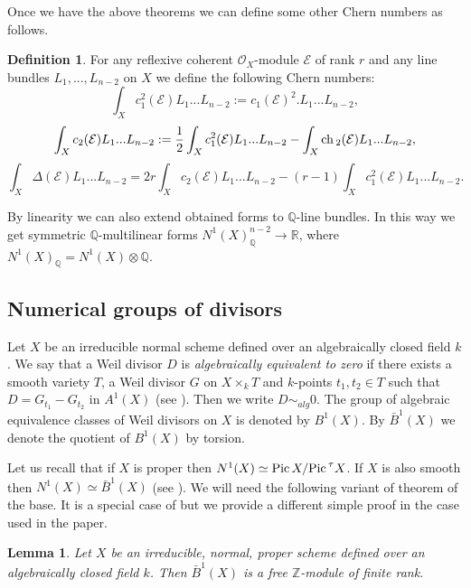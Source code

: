 \documentclass[12pt]{article}
\theoremstyle{plain}
\newtheorem{Lemma}[Thm]{\sc Lemma}
\theoremstyle{definition}
\newtheorem{Definition}[Thm]{Definition}
\theoremstyle{remark}
\newcommand{\ZZ}{{\mathbb Z}}
\newcommand{\QQ}{{\mathbb Q}}
\newcommand{\RR}{{\mathbb R}}
\newcommand{\cE}{{\mathcal E}}
\newcommand{\cO}{{\mathcal O}}
\newcommand{\Pic}{{\mathop{\rm Pic \, }}}
\newcommand{\ch}{{\mathop{\rm ch \, }}}
\begin{document}
Once we have the above theorems we can define some other Chern numbers as follows.

\begin{Definition}
	For any reflexive coherent $\cO_X$-module $\cE$ of rank $r$ and any line bundles $L_1,...,L_{n-2}$ on $X$
	we define the following Chern numbers:
	$$\int_X c_1 ^2(\cE) L_1...L_{n-2}:= c_1 (\cE)^2.L_1...L_{n-2},$$
	$$\int _X c_2 (\cE)L_1...L_{n-2}:= \frac{1}{2} \int_X c_1 ^2(\cE) L_1...L_{n-2}-\int _X \ch _2 (\cE)L_1...L_{n-2},$$
	$$\int _X \Delta (\cE)L_1...L_{n-2}=2r \int _X c_2 (\cE)L_1...L_{n-2} -(r-1)\int_X c_1 ^2(\cE) L_1...L_{n-2}.$$
\end{Definition}

By linearity we can also extend obtained forms to $\QQ$-line bundles. In this way we get symmetric $\QQ$-multilinear forms $N^1(X)_{\QQ}^{n-2}\to \RR$, where $N^1(X)_{\QQ}=N^1(X)\otimes \QQ$. 


\subsection{Numerical groups of divisors}

Let $X$ be an irreducible normal scheme defined over an algebraically closed field $k$.
We say that  a Weil divisor $D$ is \emph{algebraically equivalent to zero} if there exists a smooth variety $T$, a Weil divisor $ G$ on $X\times _kT$ and $k$-points $t_1,t_2\in T$ 
such that $D= G_{t_1}-G_{t_2}$ in $A^1(X)$  (see \cite[10.3]{Fu}). Then we write $D\sim _{alg}0$. 
The group of algebraic equivalence classes of Weil divisors on $X$ is denoted by  $B^1(X)$. 
By $\bar B^1(X)$ we denote the quotient of $B^1(X)$ by torsion.

 
Let us recall that if $X$ is proper then $N^1(X)\simeq \Pic X/\Pic ^{\tau} X$.
If $X$ is also smooth  then $N^1(X)\simeq \bar B^1(X)$ (see \cite[Theorem 9.6.3]{Kl}).  
We will need the following variant of theorem of the base. It is a special case of \cite[Th\'eor\`eme 3]{Ka} but we provide a different simple proof in the case used in the paper.


\begin{Lemma}\label{Neron-Severi}
	Let $X$ be an irreducible, normal, proper scheme defined over an algebraically closed field $k$. Then $\bar B^1(X)$ is a free $\ZZ$-module of finite rank.
\end{Lemma}
\end{document}
